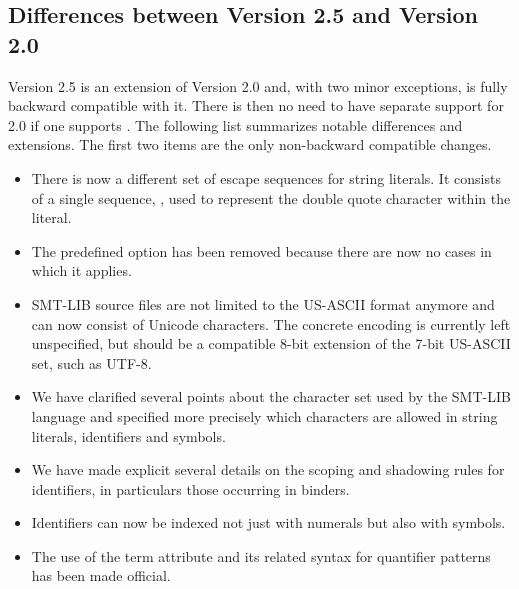 \subsection{Differences between Version 2.5 and Version 2.0}

Version 2.5 is an extension of Version 2.0 and, with two minor exceptions,
is fully backward compatible with it.
There is then no need to have separate support for 2.0 
if one supports \thisversion.
The following list summarizes notable differences and extensions.
The first two items are the only non-backward compatible changes.


\begin{itemize}
\item
There is now a different set of escape sequences for string literals.
It consists of a single sequence, , used to represent the double quote
character within the literal.

\item
The predefined option  has been removed
because there are now no cases in which it applies. 

\item
SMT-LIB source files are not limited to the US-ASCII format anymore
and can now consist of Unicode characters.  
The concrete encoding is currently left unspecified, but should be 
a compatible 8-bit extension of the 7-bit US-ASCII set, such as UTF-8.

\item
We have clarified several points about the character set used 
by the SMT-LIB language and specified more precisely which characters are allowed
in string literals, identifiers and symbols.

\item
We have made explicit several details on the scoping and shadowing rules
for identifiers, in particulars those occurring in binders.

\item
Identifiers can now be indexed not just with numerals but also with symbols.

\item
The use of the term attribute  and its related syntax 
for quantifier patterns has been made official.

 

\end{itemize}
